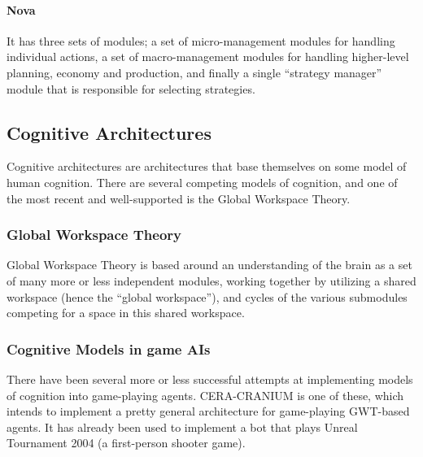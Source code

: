\paragraph{Nova}
It has three sets of modules; a set of micro-management modules for handling
individual actions, a set of macro-management modules for handling higher-level
planning, economy and production, and finally a single ``strategy manager''
module that is responsible for selecting strategies.

\subsection{Cognitive Architectures}
Cognitive architectures are architectures that base themselves on some model of
human cognition. There are several competing models of cognition, and one of
the most recent and well-supported is the Global Workspace Theory.

\subsubsection{Global Workspace Theory}
Global Workspace Theory is based around an understanding of the brain as a set
of many more or less independent modules, working together by utilizing a
shared workspace (hence the ``global workspace''), and cycles
of the various submodules competing for a space in this
shared workspace.\cite{baars2005gwd}


\subsubsection{Cognitive Models in game AIs}
There have been several more or less successful attempts at implementing models
of cognition into game-playing agents. CERA-CRANIUM is one of these, which
intends to implement a pretty general architecture for game-playing GWT-based
agents. It has already been used to implement a bot that plays Unreal
Tournament 2004 (a first-person shooter game). \cite{Arrabales2009}
